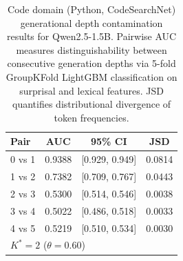 \begin{table}[t]
\centering
\small
\caption{Code domain (Python, CodeSearchNet) generational depth contamination results for Qwen2.5-1.5B. Pairwise AUC measures distinguishability between consecutive generation depths via 5-fold GroupKFold LightGBM classification on surprisal and lexical features. JSD quantifies distributional divergence of token frequencies.}
\label{tab:code_domain_qwen}
\begin{tabular}{l c c c}
\toprule
Pair & AUC & 95\% CI & JSD \\
\midrule
0 vs 1 & 0.9388 & [0.929, 0.949] & 0.0814 \\
1 vs 2 & 0.7382 & [0.709, 0.767] & 0.0443 \\
2 vs 3 & 0.5300 & [0.514, 0.546] & 0.0038 \\
3 vs 4 & 0.5022 & [0.486, 0.518] & 0.0033 \\
4 vs 5 & 0.5219 & [0.510, 0.534] & 0.0030 \\
\midrule
\multicolumn{4}{l}{$K^* = 2$ ($\theta = 0.60$)} \\
\bottomrule
\end{tabular}
\end{table}
